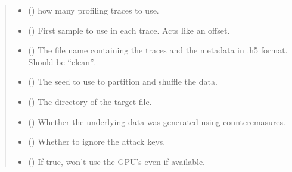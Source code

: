 \documentclass[letterpaper,10pt,english]{sphinxmanual}
\begin{document}
\begin{fulllineitems}
\begin{fulllineitems}
\begin{quote}
\begin{description}
\begin{itemize}
\item {} 
\sphinxAtStartPar
{} (\sphinxstyleliteralemphasis{\sphinxupquote{, }}) \textendash{} how many profiling traces to use.

\item {} 
\sphinxAtStartPar
{} (\sphinxstyleliteralemphasis{\sphinxupquote{, }}) \textendash{} First sample to use in each trace. Acts like an offset.

\item {} 
\sphinxAtStartPar
{} () \textendash{} The file name containing the traces and the metadata in .h5 format. Should be “clean”.

\item {} 
\sphinxAtStartPar
{} (\sphinxstyleliteralemphasis{\sphinxupquote{, }}) \textendash{} The seed to use to partition and shuffle the data.

\item {} 
\sphinxAtStartPar
{} (\sphinxstyleliteralemphasis{\sphinxupquote{, }}) \textendash{} The directory of the target file.

\item {} 
\sphinxAtStartPar
{} (\sphinxstyleliteralemphasis{\sphinxupquote{, }}) \textendash{} Whether the underlying data was generated using counteremasures.

\item {} 
\sphinxAtStartPar
{} (\sphinxstyleliteralemphasis{\sphinxupquote{, }}) \textendash{} Whether to ignore the attack keys.

\item {} 
\sphinxAtStartPar
{} (\sphinxstyleliteralemphasis{\sphinxupquote{, }}) \textendash{} If true, won’t use the GPU’s even if available.


\end{itemize}
\end{description}
\end{quote}
\end{fulllineitems}
\end{fulllineitems}
\end{document}
